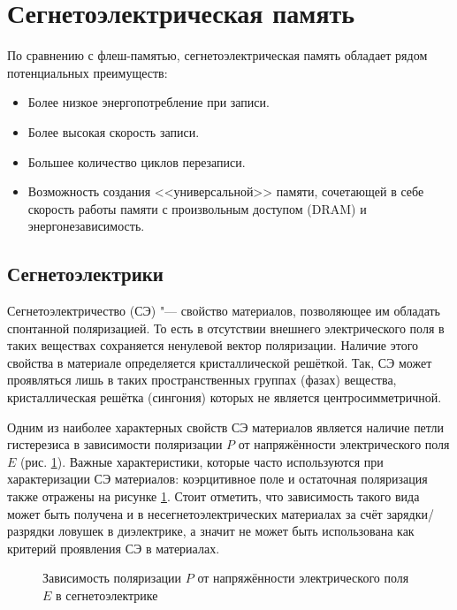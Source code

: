 \section{Сегнетоэлектрическая память}\label{sec:ch1/sec2}

\noindent По сравнению с флеш-памятью, сегнетоэлектрическая память обладает рядом потенциальных преимуществ:
\begin{itemize}
    \item Более низкое энергопотребление при записи.
    \item Более высокая скорость записи.
    \item Большее количество циклов перезаписи.
    \item Возможность создания <<универсальной>> памяти, сочетающей в себе скорость работы памяти с произвольным доступом (DRAM) и энергонезависимость.
\end{itemize}

\subsection{Сегнетоэлектрики}
Сегнетоэлектричество (СЭ) "--- свойство материалов, позволяющее им обладать спонтанной поляризацией. То есть в отсутствии внешнего электрического поля в таких веществах сохраняется ненулевой вектор поляризации. Наличие этого свойства в материале определяется кристаллической решёткой. Так, СЭ может проявляться лишь в таких пространственных группах (фазах) вещества, кристаллическая решётка (сингония) которых не является центросимметричной.

Одним из наиболее характерных свойств СЭ материалов является наличие петли гистерезиса в зависимости поляризации \(P\) от напряжённости электрического поля \(E\) (рис. \cref{fig:hysteresis}). Важные характеристики, которые часто используются при характеризации СЭ материалов: коэрцитивное поле и остаточная поляризация также отражены на рисунке \cref{fig:hysteresis}. Стоит отметить, что зависимость такого вида может быть получена и в несегнетоэлектрических материалах за счёт зарядки/разрядки ловушек в диэлектрике, а значит не может быть использована как критерий проявления СЭ в материалах.

\begin{figure}[ht]
    \caption{Зависимость поляризации \(P\) от напряжённости электрического поля \(E\) в сегнетоэлектрике}\label{fig:hysteresis}
\end{figure}

